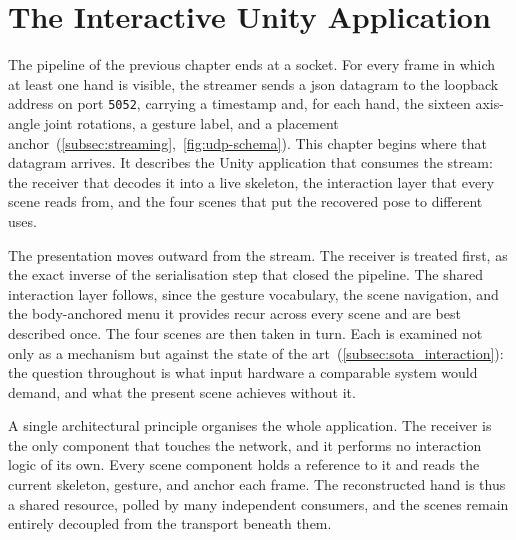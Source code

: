 
\section{The Interactive Unity Application}\label{sec:application}

The pipeline of the previous chapter ends at a socket. For every frame in
which at least one hand is visible, the streamer sends a \acrshort{json}
datagram to the loopback address on port \texttt{5052}, carrying a timestamp
and, for each hand, the sixteen axis-angle joint rotations, a gesture label,
and a placement anchor~(\autoref{subsec:streaming},~\autoref{fig:udp-schema}).
This chapter begins where that datagram arrives. It describes the Unity
application that consumes the stream: the receiver that decodes it into a live
skeleton, the interaction layer that every scene reads from, and the four
scenes that put the recovered pose to different uses.

The presentation moves outward from the stream. The receiver is treated first,
as the exact inverse of the serialisation step that closed the pipeline. The
shared interaction layer follows, since the gesture vocabulary, the scene
navigation, and the body-anchored menu it provides recur across every scene and
are best described once. The four scenes are then taken in turn. Each is
examined not only as a mechanism but against the state of the
art~(\autoref{subsec:sota_interaction}): the question throughout is what input
hardware a comparable system would demand, and what the present scene achieves
without it.

A single architectural principle organises the whole application. The receiver
is the only component that touches the network, and it performs no interaction
logic of its own. Every scene component holds a reference to it and reads the
current skeleton, gesture, and anchor each frame. The reconstructed hand is thus
a shared resource, polled by many independent consumers, and the scenes remain
entirely decoupled from the transport beneath them.
